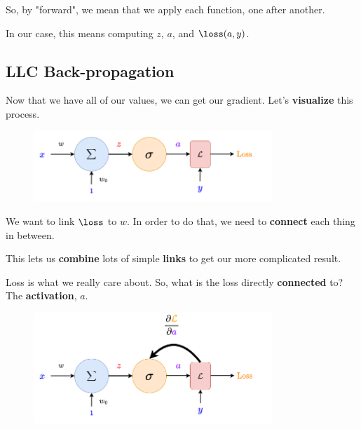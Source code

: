         So, by "forward", we mean that we apply each function, one after another.
        
        In our case, this means computing $z$, $a$, and $\loss(a,y)$.
        
    \secdiv
    
    \subsection{LLC Back-propagation}
    
        Now that we have all of our values, we can get our gradient. Let's \textbf{visualize} this process.
        
        \begin{figure}[H]
            \centering
            \includegraphics[width=90mm,scale=0.4]{images/nn_1_5_images/llc_as_neuron_loss.png}
        \end{figure}
        
        We want to link $\loss$ to $w$. In order to do that, we need to \textbf{connect} each thing in between.
        
        This lets us \textbf{combine} lots of simple \textbf{links} to get our more complicated result.
            
        Loss is what we really care about. So, what is the loss directly \textbf{connected} to? The \textbf{activation}, $a$.
        
        \begin{figure}[H]
            \centering
            \includegraphics[width=90mm,scale=0.4]{images/nn_1_5_images/llc_backprop_1.png}
        \end{figure}
        

